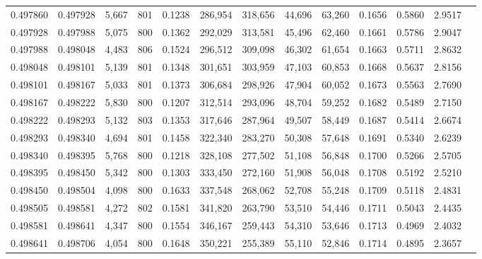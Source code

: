 \begin{tabular}{rrrrrrrrrrrrr}
0.497860 & 0.497928 & 5,667 & 801 &                                     0.1238 & 286,954 & 318,656 &  44,696 &  63,260 & 0.1656 & 0.5860 & 2.9517 \\
0.497928 & 0.497988 & 5,075 & 800 &                                     0.1362 & 292,029 & 313,581 &  45,496 &  62,460 & 0.1661 & 0.5786 & 2.9047 \\
0.497988 & 0.498048 & 4,483 & 806 &                                     0.1524 & 296,512 & 309,098 &  46,302 &  61,654 & 0.1663 & 0.5711 & 2.8632 \\
0.498048 & 0.498101 & 5,139 & 801 &                                     0.1348 & 301,651 & 303,959 &  47,103 &  60,853 & 0.1668 & 0.5637 & 2.8156 \\
0.498101 & 0.498167 & 5,033 & 801 &                                     0.1373 & 306,684 & 298,926 &  47,904 &  60,052 & 0.1673 & 0.5563 & 2.7690 \\
0.498167 & 0.498222 & 5,830 & 800 &                                     0.1207 & 312,514 & 293,096 &  48,704 &  59,252 & 0.1682 & 0.5489 & 2.7150 \\
0.498222 & 0.498293 & 5,132 & 803 &                                     0.1353 & 317,646 & 287,964 &  49,507 &  58,449 & 0.1687 & 0.5414 & 2.6674 \\
0.498293 & 0.498340 & 4,694 & 801 &                                     0.1458 & 322,340 & 283,270 &  50,308 &  57,648 & 0.1691 & 0.5340 & 2.6239 \\
0.498340 & 0.498395 & 5,768 & 800 &                                     0.1218 & 328,108 & 277,502 &  51,108 &  56,848 & 0.1700 & 0.5266 & 2.5705 \\
0.498395 & 0.498450 & 5,342 & 800 &                                     0.1303 & 333,450 & 272,160 &  51,908 &  56,048 & 0.1708 & 0.5192 & 2.5210 \\
0.498450 & 0.498504 & 4,098 & 800 &                                     0.1633 & 337,548 & 268,062 &  52,708 &  55,248 & 0.1709 & 0.5118 & 2.4831 \\
0.498505 & 0.498581 & 4,272 & 802 &                                     0.1581 & 341,820 & 263,790 &  53,510 &  54,446 & 0.1711 & 0.5043 & 2.4435 \\
0.498581 & 0.498641 & 4,347 & 800 &                                     0.1554 & 346,167 & 259,443 &  54,310 &  53,646 & 0.1713 & 0.4969 & 2.4032 \\
0.498641 & 0.498706 & 4,054 & 800 &                                     0.1648 & 350,221 & 255,389 &  55,110 &  52,846 & 0.1714 & 0.4895 & 2.3657 \\

\end{tabular}
